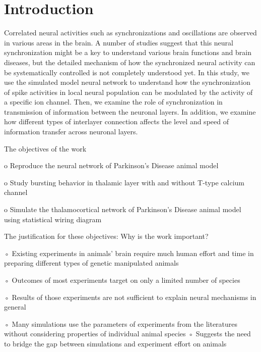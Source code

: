 \chapter{Introduction}


Correlated neural activities such as synchronizations and oscillations are observed in various areas in the brain. A number of studies suggest that this neural synchronization might be a key to understand various brain functions and brain diseases, but the detailed mechanism of how the synchronized neural activity can be systematically controlled is not completely understood yet. 
In this study, we use the simulated model neural network to understand how the synchronization of spike activities in local neural population can be modulated by the activity of a specific ion channel. Then, we examine the role of synchronization in transmission of information between the neuronal layers. In addition, we examine how different types of interlayer connection affects the level and speed of information transfer across neuronal layers. 

The objectives of the work

o Reproduce the neural network of Parkinson’s Disease animal model

o Study bursting behavior in thalamic layer with and without T-type calcium channel

o Simulate the thalamocortical network of Parkinson’s Disease animal model using statistical wiring diagram


The justification for these objectives: Why is the work important?

◦ Existing experiments in animals’ brain require much human effort and time in preparing different types of genetic manipulated animals

◦ Outcomes of most experiments target on only a limited number of species

◦ Results of those experiments are not sufficient to explain neural mechanisms in general

◦ Many simulations use the parameters of experiments from the literatures without considering properties of individual animal species
◦ Suggests the need to bridge the gap between simulations and experiment effort on animals

